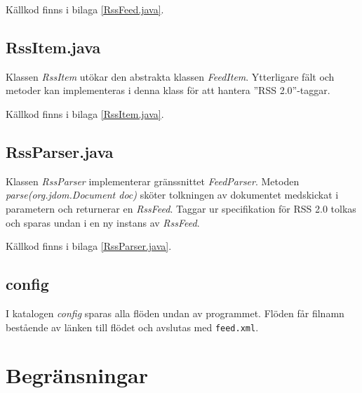 \documentclass[titlepage, twoside, a4paper, 12pt]{article}
\begin{document}
Källkod finns i bilaga \ref{RssFeed.java}.
\subsection{RssItem.java}\label{RssItem}
Klassen \textit{RssItem} utökar den abstrakta klassen
\textit{FeedItem}. Ytterligare fält och metoder kan implementeras i
denna klass för att hantera ''RSS 2.0''-taggar.

Källkod finns i bilaga \ref{RssItem.java}.
\subsection{RssParser.java}\label{RssParser}
Klassen \textit{RssParser} implementerar gränssnittet
\textit{FeedParser}. Metoden \textit{parse(org.jdom.Document doc)}
sköter tolkningen av dokumentet medskickat i parametern och returnerar
en \textit{RssFeed}. Taggar ur specifikation för RSS 2.0 tolkas och
sparas undan i en ny instans av \textit{RssFeed}.

Källkod finns i bilaga \ref{RssParser.java}.
\subsection{config}
I katalogen \textit{config} sparas alla flöden undan av
programmet. Flöden får filnamn bestående av länken till flödet och
avslutas med \verb!feed.xml!.

\section{Begränsningar}\label{Begransningar}
\end{document}

